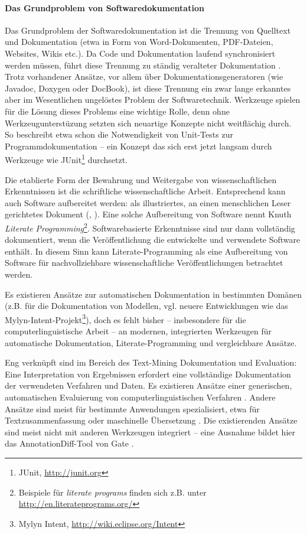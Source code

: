 \documentclass[abstracton, 12pt]{scrartcl}
\begin{document}
\paragraph{Das Grundproblem von Softwaredokumentation}

Das Grundproblem der Softwaredokumentation ist die Trennung von Quelltext und Dokumentation (etwa in Form von Word-Dokumenten, PDF-Dateien, Websites, Wikis etc.). Da Code und Dokumentation laufend synchronisiert werden müssen, führt diese Trennung zu ständig veralteter Dokumentation \citep[169]{Brooks1995}. Trotz vorhandener Ansätze, vor allem über Dokumentationsgeneratoren (wie Javadoc, Doxygen oder DocBook), ist diese Trennung ein zwar lange erkanntes \citep{Brooks1975, Knuth1992} aber im Wesentlichen ungelöstes Problem der Softwaretechnik. Werkzeuge spielen für die Lösung dieses Problems eine wichtige Rolle, denn ohne Werkzeugunterstüzung setzten sich neuartige Konzepte nicht weitflächig durch. So beschreibt etwa schon \citet[165f.]{Brooks1975,Brooks1995} die Notwendigkeit von Unit-Tests zur Programmdokumentation -- ein Konzept das sich erst jetzt langsam durch Werkzeuge wie JUnit\footnote{JUnit, \url{http://junit.org}} durchsetzt.

Die etablierte Form der Bewahrung und Weitergabe von wissenschaftlichen Erkenntnissen ist die schriftliche wissenschaftliche Arbeit. Entsprechend kann auch Software aufbereitet werden: als illustriertes, an einen menschlichen Leser gerichtetes Dokument (\citealt{Knuth1992}, \citealt[164]{Brooks1995}). Eine solche Aufbereitung von Software nennt Knuth \emph{Literate Programming}\footnote{Beispiele für \emph{literate programs} finden sich z.B. unter \url{http://en.literateprograms.org/}}. Softwarebasierte Erkenntnisse sind nur dann vollständig dokumentiert, wenn die Veröffentlichung die entwickelte und verwendete Software enthält. In diesem Sinn kann Literate-Programming als eine Aufbereitung von Software für nachvollziehbare wissenschaftliche Veröffentlichungen betrachtet werden.

Es existieren Ansätze zur automatischen Dokumentation in bestimmten Do\-mänen (z.B. \citealt{AhlichEtAl2008} für die Dokumentation von Modellen, vgl. neuere Entwicklungen wie das Mylyn-Intent-Projekt\footnote{Mylyn Intent, \url{http://wiki.eclipse.org/Intent}}), doch es fehlt bisher -- insbesondere für die computerlinguistische Arbeit -- an modernen, integrierten Werkzeugen für automatische Dokumentation, Literate-Programming und vergleichbare Ansätze.

Eng verknüpft sind im Bereich des Text-Mining Dokumentation und Evaluation: Eine Interpretation von Ergebnissen erfordert eine vollständige Dokumentation der verwendeten Verfahren und Daten. Es existieren Ansätze einer generischen, automatischen Evaluierung von computerlinguistischen Verfahren \citep{BigertEtAl2003,Halpin2006}. Andere Ansätze sind meist für bestimmte Anwendungen spezialisiert, etwa für Textzusammenfassung \citep{Lin2004a,Lin2004b} oder maschinelle Übersetzung \citep{PapineniEtAl2002,VanZaanenAndZwarts2006}. Die existierenden Ansätze sind meist nicht mit anderen Werkzeugen integriert -- eine Ausnahme bildet hier das AnnotationDiff-Tool von Gate \citep{CunninghamEtAl2002}.
\end{document}
